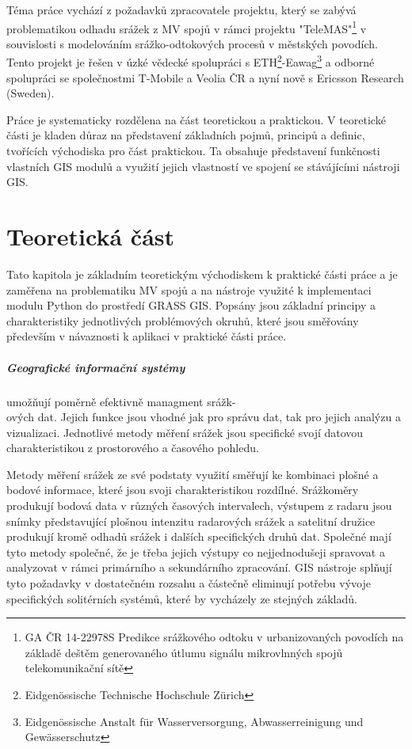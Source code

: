 \documentclass[a4paper,12pt,oneside]{report}
\begin{document}
Téma práce vychází z požadavků zpracovatele projektu, který se zabývá problematikou odhadu srážek z MV spojů v rámci projektu "TeleMAS"\footnote{GA ČR 14-22978S Predikce srážkového odtoku v urbanizovaných povodích na základě deštěm generovaného útlumu signálu mikrovlnných spojů telekomunikační sítě} v souvislosti s modelováním srážko-odtokových procesů v městských povodích. Tento projekt je řešen v úzké vědecké spolupráci s ETH\footnote{ Eidgenössische Technische Hochschule Zürich}-Eawag\footnote{Eidgenössische Anstalt für Wasserversorgung, Abwasserreinigung und Gewässerschutz} a odborné spolupráci se společnostmi T-Mobile a Veolia ČR a nyní nově s Ericsson Research (Sweden).

Práce je systematicky rozdělena na část teoretickou a praktickou. V teoretické části je kladen důraz na představení základních pojmů, principů a definic, tvořících východiska pro část praktickou. Ta obsahuje  představení funkčnosti vlastních GIS modulů a využití jejich vlastností ve spojení se stávájícími nástroji GIS.

 



\newpage
\chapter*{Teoretická část}
Tato kapitola je základním teoretickým východiskem k praktické části práce a je zaměřena na problematiku MV spojů a na nástroje využité k implementaci modulu Python do prostředí GRASS GIS. Popsány jsou základní principy a charakteristiky jednotlivých problémových okruhů, které jsou směřovány především v návaznosti k aplikaci v praktické části práce.



\paragraph*{Geografické informační systémy} umožňují poměrně efektivně managment srážk-\\ových dat. Jejich funkce jsou vhodné jak pro správu dat, tak pro jejich analýzu a vizualizaci. Jednotlivé metody měření srážek jsou specifické svojí datovou charakteristikou z prostorového a časového pohledu.

Metody měření srážek ze své podstaty využití směřují ke kombinaci plošné a bodové informace, které jsou svoji charakteristikou rozdílné. Srážkoměry produkují bodová data v různých časových intervalech, výstupem z radaru jsou snímky představující plošnou intenzitu radarových srážek a satelitní družice produkují kromě odhadů srážek i dalších specifických druhů dat. Společné mají tyto metody společné, že je třeba jejich výstupy  co nejjednodušeji  spravovat a analyzovat v rámci primárního a sekundárního zpracování. GIS nástroje splňují tyto požadavky v dostatečném rozsahu a částečně eliminují potřebu vývoje specifických solitérních systémů, které by  vycházely ze stejných základů.
\end{document}
